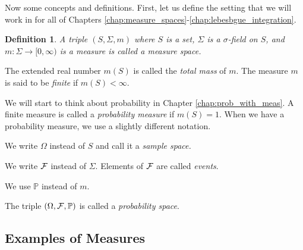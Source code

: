 \documentclass[a4paper]{report}
\newcounter{thm_counter}[chapter]
\newtheorem{defn}[thm_counter]{Definition}
\numberwithin{equation}{chapter}
\numberwithin{thm_counter}{section}
\def\to{\rightarrow} %
\def\mb{\mathbb} %
\def\P{\mb{P}}
\begin{document}
Now some concepts and definitions. First, let us define the setting that we will work in for all of Chapters \ref{chap:measure_spaces}-\ref{chap:lebesbgue_integration}. 
\begin{defn}
A triple $(S, \Sigma, m)$ where $S$ is a set, $\Sigma$ is a $\sigma$-field on $S$, and $m:\Sigma\to[0,\infty)$ is a measure is called a {\it measure space}. 
\end{defn}
The extended real number $m(S)$ is called the {\it total mass} of $m$. The measure $m$ is said to be {\it finite} if $m(S) < \infty$. 

We will start to think about probability in Chapter \ref{chap:prob_with_meas}. A finite measure is called a {\it probability measure} if $m(S) = 1$. When we have a probability measure, we use a slightly different notation.

\begin{center}

We write $\Omega$ instead of $S$ and call it a {\it sample space.}

We write ${\cal F}$ instead of $\Sigma$. Elements of ${\cal F}$ are called {\it events}.

We use $\P$ instead of $m$.


The triple $(\Omega, {\cal F}, \P)$ is called a {\it probability space}.

\end{center}

\newpage
\subsection{Examples of Measures}
\end{document}
